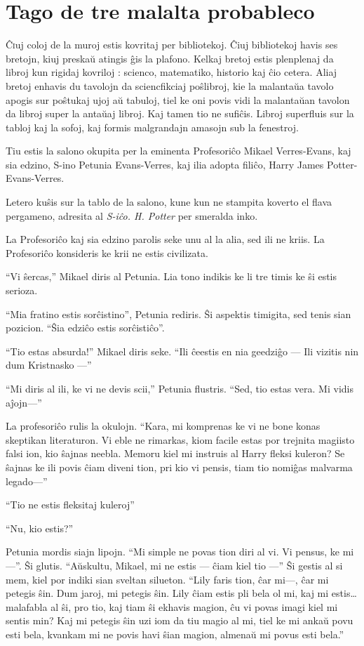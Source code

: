 \chapter{Tago de tre malalta probableco}

\lettrine{Ĉ}iuj coloj de la muroj estis kovritaj per bibliotekoj. Ĉiuj
bibliotekoj havis ses bretojn, kiuj preskaŭ atingis ĝis la
plafono. Kelkaj bretoj estis plenplenaj da libroj kun rigidaj kovriloj
: scienco, matematiko, historio kaj ĉio cetera. Aliaj bretoj enhavis
du tavolojn da sciencfikciaj poŝlibroj, kie la malantaŭa tavolo
apogis sur poŝtukaj ujoj aŭ tabuloj, tiel ke oni povis vidi la malantaŭan
tavolon da libroj super la antaŭaj libroj. Kaj tamen tio ne
sufiĉis. Libroj superfluis sur la tabloj kaj la sofoj, kaj formis
malgrandajn amasojn sub la fenestroj.

Tiu estis la salono okupita per la eminenta Profesoriĉo Mikael
Verres-Evans, kaj sia edzino, S-ino Petunia Evans-Verres, kaj
ilia adopta filiĉo, Harry James Potter-Evans-Verres. 

Letero kuŝis sur la tablo de la salono, kune kun ne stampita koverto
el flava pergameno, adresita al \emph{S-iĉo. H. Potter} per smeralda
inko.

La Profesoriĉo kaj sia edzino parolis seke unu al la alia, sed ili ne
kriis. La Profesoriĉo konsideris ke krii ne estis civilizata.

``Vi ŝercas,'' Mikael diris al Petunia. Lia tono indikis ke li tre
timis ke ŝi estis serioza.

``Mia fratino estis sorĉistino'', Petunia rediris. Ŝi aspektis timigita,
sed tenis sian pozicion. ``Ŝia edziĉo estis sorĉistiĉo''.

``Tio estas absurda!'' Mikael diris seke. ``Ili ĉeestis en nia geedziĝo — Ili
vizitis nin dum Kristnasko —''

``Mi diris al ili, ke vi ne devis scii,'' Petunia flustris. ``Sed, tio
estas vera. Mi vidis aĵojn—''

La profesoriĉo rulis la okulojn. ``Kara, mi komprenas ke vi ne bone
konas skeptikan literaturon. Vi eble ne rimarkas, kiom facile estas por
trejnita magiisto falsi ion, kio ŝajnas neebla. Memoru kiel mi
instruis al Harry fleksi kuleron? Se ŝajnas ke ili povis ĉiam diveni
tion, pri kio vi pensis, tiam tio nomiĝas malvarma legado—''

``Tio ne estis fleksitaj kuleroj''

``Nu, kio estis?''

Petunia mordis siajn lipojn. ``Mi simple ne povas tion diri al vi. Vi
pensus, ke mi —''. Ŝi glutis. ``Aŭskultu, Mikael, mi ne estis — ĉiam
kiel tio —'' Ŝi gestis al si mem, kiel por indiki sian sveltan
silueton. ``Lily faris tion, ĉar mi—, ĉar mi petegis ŝin. Dum jaroj,
mi petegis ŝin. Lily ĉiam estis pli bela ol mi, kaj mi estis\ldots{}
malafabla al ŝi, pro tio, kaj tiam ŝi ekhavis magion, ĉu vi povas
imagi kiel mi sentis min?  Kaj mi petegis ŝin uzi iom da tiu magio al
mi, tiel ke mi ankaŭ povu esti bela, kvankam mi ne povis havi ŝian
magion, almenaŭ mi povus esti bela.''

